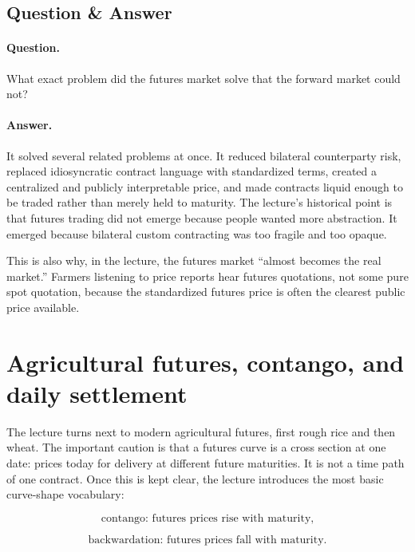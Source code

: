 \subsection{Question \& Answer}

\paragraph{Question.} What exact problem did the futures market solve that the forward market could not?

\paragraph{Answer.} It solved several related problems at once. It reduced bilateral counterparty risk, replaced idiosyncratic contract language with standardized terms, created a centralized and publicly interpretable price, and made contracts liquid enough to be traded rather than merely held to maturity. The lecture's historical point is that futures trading did not emerge because people wanted more abstraction. It emerged because bilateral custom contracting was too fragile and too opaque.

This is also why, in the lecture, the futures market ``almost becomes the real market.'' Farmers listening to price reports hear futures quotations, not some pure spot quotation, because the standardized futures price is often the clearest public price available.

\section{Agricultural futures, contango, and daily settlement}

The lecture turns next to modern agricultural futures, first rough rice and then wheat. The important caution is that a futures curve is a cross section at one date: prices today for delivery at different future maturities. It is not a time path of one contract. Once this is kept clear, the lecture introduces the most basic curve-shape vocabulary:

\begin{equation}
\text{contango: futures prices rise with maturity,}
\end{equation}

\begin{equation}
\text{backwardation: futures prices fall with maturity.}
\end{equation}

